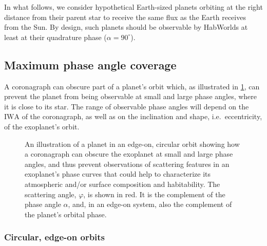 \documentclass[
    usenatbib,
]{mnras}
\newcommand{\IWA}{\ensuremath{\mathrm{IWA}}}
\newcommand{\hwo}{HabWorlds}
\begin{document}
In what follows, we consider hypothetical Earth-sized planets orbiting at the right distance from their parent star to receive the same flux as the Earth receives from the Sun.
%
By design, such planets should be observable by \hwo{} at least at their quadrature phase ($\alpha=90^\circ$).


\subsection{Maximum phase angle coverage}
\label{subsec:2.2}

A coronagraph can obscure part of a planet's orbit which, as illustrated in \cref{fig:annotated-orbit}, can prevent the planet from being observable at small and large phase angles, where it is close to its star. 
%
The range of observable phase angles will depend on the \IWA{} of the coronagraph, as well as on the inclination and shape, i.e.\ eccentricity, of the exoplanet's orbit.

\begin{figure}
    \centering
    
    \caption{
        An illustration of a planet in an edge-on, circular orbit showing how a coronagraph can obscure the exoplanet at small and large phase angles, and thus prevent observations of scattering features in an exoplanet's phase curves that could help to characterize its atmospheric and/or surface composition and habitability. 
        The scattering angle, $\varphi$, is shown in red. It is the complement of the phase angle $\alpha$, and, in an edge-on system, also the complement of the planet's orbital phase.
    }
    \label{fig:annotated-orbit}
\end{figure}

\subsubsection{Circular, edge-on orbits}
\end{document}
